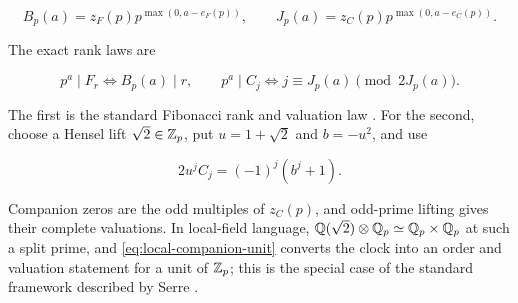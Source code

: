 \begin{equation}
 B_p(a)=z_F(p)p^{\max(0,a-e_F(p))},
 \qquad
 J_p(a)=z_C(p)p^{\max(0,a-e_C(p))}.
 \label{eq:lifted-ranks}
\end{equation}

The exact rank laws are

\begin{equation}
 p^a\mid F_r\Longleftrightarrow B_p(a)\mid r,
 \qquad
 p^a\mid C_j\Longleftrightarrow
 j\equiv J_p(a)\pmod {2J_p(a)}.
 \label{eq:rank-laws}
\end{equation}

The first is the standard Fibonacci rank and valuation law
\cite{Lengyel1995,Sanna2016}. For the second, choose a Hensel lift
$\sqrt2\in\mathbb{Z}_p$, put $u=1+\sqrt2$ and $b=-u^2$, and use

\begin{equation}
 2u^jC_j=(-1)^j(b^j+1).
 \label{eq:local-companion-unit}
\end{equation}

Companion zeros are the odd multiples of $z_C(p)$, and odd-prime lifting
gives their complete valuations. In local-field language,
$\mathbb{Q}(\sqrt2)\otimes\mathbb{Q}_p\simeq\mathbb{Q}_p\times\mathbb{Q}_p$ at such a split prime, and
\cref{eq:local-companion-unit} converts the clock into an order and
valuation statement for a unit of $\mathbb{Z}_p$; this is the special case of the
standard framework described by Serre \cite{Serre1979LocalFields}.

